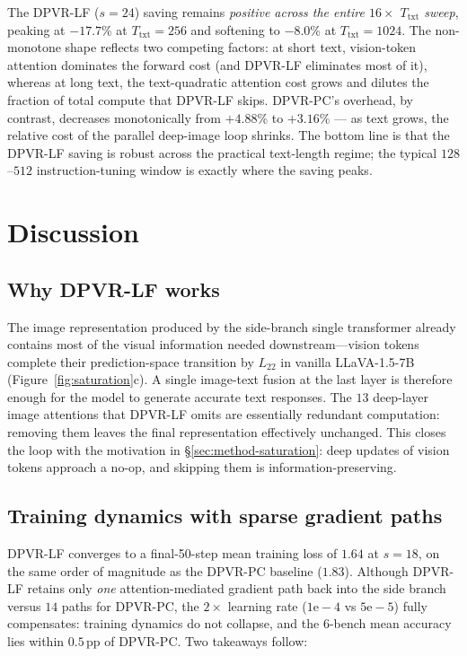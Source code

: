 \documentclass[a4paper,fleqn,review]{cas-sc}
\newcommand{\dpvrlf}{DPVR-LF}
\newcommand{\dpvrpc}{DPVR-PC}
\begin{document}
The \dpvrlf{} ($s = 24$) saving remains \emph{positive across the
entire $16\times$ $T_{\mathrm{txt}}$ sweep}, peaking at $-17.7$\% at
$T_{\mathrm{txt}} = 256$ and softening to $-8.0$\% at
$T_{\mathrm{txt}} = 1024$. The non-monotone shape reflects two
competing factors: at short text, vision-token attention dominates
the forward cost (and \dpvrlf{} eliminates most of it), whereas at
long text, the text-quadratic attention cost grows and dilutes the
fraction of total compute that \dpvrlf{} skips. \dpvrpc{}'s
overhead, by contrast, decreases monotonically from $+4.88$\% to
$+3.16$\% — as text grows, the relative cost of the parallel
deep-image loop shrinks. The bottom line is that the \dpvrlf{}
saving is robust across the practical text-length regime; the
typical $128$--$512$ instruction-tuning window is exactly where the
saving peaks.

\section{Discussion}\label{sec:discuss}

\subsection{Why \dpvrlf{} works}

The image representation produced by the side-branch single
transformer already contains most of the visual information needed
downstream---vision tokens complete their prediction-space transition
by $L_{22}$ in vanilla LLaVA-1.5-7B (Figure~\ref{fig:saturation}c).
A single image-text fusion at the last layer is therefore enough for
the model to generate accurate text responses. The $13$ deep-layer
image attentions that \dpvrlf{} omits are essentially redundant
computation: removing them leaves the final representation
effectively unchanged. This closes the loop with the motivation in
\S\ref{sec:method-saturation}: deep updates of vision tokens
approach a no-op, and skipping them is information-preserving.

\subsection{Training dynamics with sparse gradient paths}

\dpvrlf{} converges to a final-50-step mean training loss of $1.64$
at $s = 18$, on the same order of magnitude as the \dpvrpc{}
baseline ($1.83$). Although \dpvrlf{} retains only \emph{one}
attention-mediated gradient path back into the side branch versus
$14$ paths for \dpvrpc{}, the $2\times$ learning rate
($1\mathrm{e}{-}4$ vs $5\mathrm{e}{-}5$) fully compensates: training
dynamics do not collapse, and the 6-bench mean accuracy lies within
$0.5$\,pp of \dpvrpc{}. Two takeaways follow:
\end{document}
